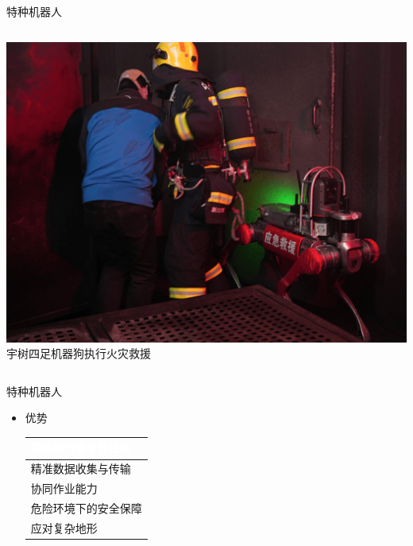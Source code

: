 \documentclass{beamer}
\begin{document}
\begin{frame}{特种机器人}
\begin{columns}[c, onlytextwidth]
\begin{column}{0.265\textwidth}
\centering
\includegraphics[width=\textwidth, keepaspectratio]{military/3.jpg}
\smallskip
{\tiny 宇树四足机器狗执行火灾救援}
\end{column}

\end{columns}
\end{frame}

\begin{frame}{特种机器人}
\setlength{\leftmargini}{0mm}
\begin{itemize}
\item 优势
\smallskip
\smallskip
\newline
\renewcommand{\arraystretch}{1.35}
\begin{tabular}{p{50mm}}
\hline
\rowcolor{KeyBlue}
\textcolor{white}{
\small 高效执行重复性任务} \\
\hline
\rowcolor{Blue1}
\small 精准数据收集与传输 \\
\hline
\rowcolor{Blue2}
\small 协同作业能力 \\
\hline
\rowcolor{Blue1}
\small 危险环境下的安全保障 \\
\hline
\rowcolor{Blue2}
\small 应对复杂地形 \\
\hline
\end{tabular}
\end{itemize}
\end{frame}
\end{document}
